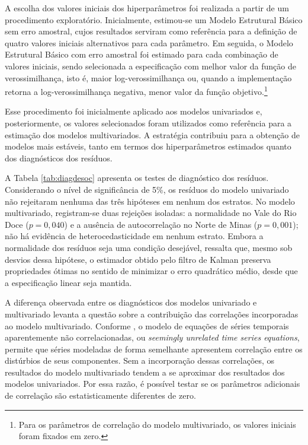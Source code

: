 \documentclass[rbe,wwwview]{econbr}
\begin{document}
A escolha dos valores iniciais dos hiperparâmetros foi realizada a partir de um procedimento exploratório. Inicialmente, estimou-se um Modelo Estrutural Básico sem erro amostral, cujos resultados serviram como referência para a definição de quatro valores iniciais alternativos para cada parâmetro. Em seguida, o Modelo Estrutural Básico com erro amostral foi estimado para cada combinação de valores iniciais, sendo selecionada a especificação com melhor valor da função de verossimilhança, isto é, maior log-verossimilhança ou, quando a implementação retorna a log-verossimilhança negativa, menor valor da função objetivo.\footnote{Para os parâmetros de correlação do modelo multivariado, os valores iniciais foram fixados em zero.}

Esse procedimento foi inicialmente aplicado aos modelos univariados e, posteriormente, os valores selecionados foram utilizados como referência para a estimação dos modelos multivariados. A estratégia contribuiu para a obtenção de modelos mais estáveis, tanto em termos dos hiperparâmetros estimados quanto dos diagnósticos dos resíduos.

A Tabela \ref{tab:diagdesoc} apresenta os testes de diagnóstico dos resíduos. Considerando o nível de significância de 5\%, os resíduos do modelo univariado não rejeitaram nenhuma das três hipóteses em nenhum dos estratos. No modelo multivariado, registram-se duas rejeições isoladas: a normalidade no Vale do Rio Doce (\(p=0{,}040\)) e a ausência de autocorrelação no Norte de Minas (\(p=0{,}001\)); não há evidência de heterocedasticidade em nenhum estrato. Embora a normalidade dos resíduos seja uma condição desejável, \citet{harvey1989} ressalta que, mesmo sob desvios dessa hipótese, o estimador obtido pelo filtro de Kalman preserva propriedades ótimas no sentido de minimizar o erro quadrático médio, desde que a especificação linear seja mantida.

\vspace{-0.3cm}

\vspace{-0.3cm}

A diferença observada entre os diagnósticos dos modelos univariado e multivariado levanta a questão sobre a contribuição das correlações incorporadas ao modelo multivariado. Conforme \citet{durbinkoop2012}, o modelo de equações de séries temporais aparentemente não correlacionadas, ou \textit{seemingly unrelated time series equations}, permite que séries modeladas de forma semelhante apresentem correlação entre os distúrbios de seus componentes. Sem a incorporação dessas correlações, os resultados do modelo multivariado tendem a se aproximar dos resultados dos modelos univariados. Por essa razão, é possível testar se os parâmetros adicionais de correlação são estatisticamente diferentes de zero.
\end{document}
